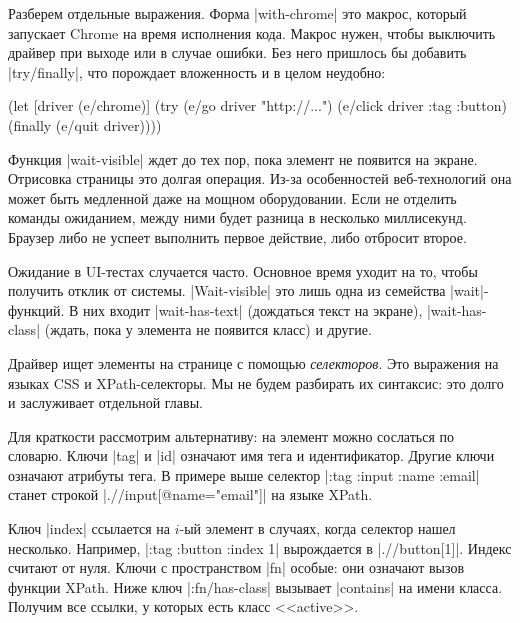 Разберем отдельные выражения. Форма \spverb|with-chrome| это макрос, который
запускает Chrome на время исполнения кода. Макрос нужен, чтобы выключить драйвер
при выходе или в случае ошибки. Без него пришлось бы добавить
\spverb|try/finally|, что порождает вложенность и в целом неудобно:


\begin{english}
  \begin{clojure}
(let [driver (e/chrome)]
  (try
    (e/go driver "http://...")
    (e/click driver {:tag :button})
    (finally
      (e/quit driver))))
  \end{clojure}
\end{english}


Функция \spverb|wait-visible| ждет до тех пор, пока элемент не появится на
экране. Отрисовка страницы это долгая операция. Из-за особенностей
веб-технологий она может быть медленной даже на мощном оборудовании. Если не
отделить команды ожиданием, между ними будет разница в несколько
миллисекунд. Браузер либо не успеет выполнить первое действие, либо отбросит
второе.

Ожидание в UI-тестах случается часто. Основное время уходит на то, чтобы
получить отклик от системы. \spverb|Wait-visible| это лишь одна из семейства
\spverb|wait|-функций. В них входит \spverb|wait-has-text| (дождаться текст на
экране), \spverb|wait-has-class| (ждать, пока у элемента не появится класс) и
другие.


Драйвер ищет элементы на странице с помощью \emph{селекторов}. Это выражения на
языках CSS и
XPath-селекторы. Мы не
будем разбирать их синтаксис: это долго и заслуживает отдельной главы.

Для краткости рассмотрим альтернативу: на элемент можно сослаться по
словарю. Ключи \spverb|tag| и \spverb|id| означают имя тега и
идентификатор. Другие ключи означают атрибуты тега. В примере выше селектор
\spverb|{:tag :input :name :email}| станет строкой
\spverb|.//input[@name="email"]| на языке XPath.


Ключ \spverb|index| ссылается на $i$-ый элемент в случаях, когда селектор нашел
несколько. Например, \spverb|{:tag :button :index 1}| вырождается в
\spverb|.//button[1]|. Индекс считают от нуля. Ключи с пространством \spverb|fn|
особые: они означают вызов функции XPath. Ниже ключ \spverb|:fn/has-class|
вызывает \spverb|contains| на имени класса. Получим все ссылки, у которых есть
класс <<active>>.

